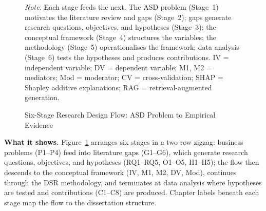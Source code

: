 \begin{figure}[!htbp]
{%
}
\caption[Research Design Flow]{Six-Stage Research Design Flow: ASD Problem to Empirical Evidence}
\label{fig:research_design_flow}
\vspace{0.5em}
\noindent\textit{Note.} Each stage feeds the next. The ASD problem (Stage~1) motivates the literature review and gaps (Stage~2); gaps generate research questions, objectives, and hypotheses (Stage~3); the conceptual framework (Stage~4) structures the variables; the methodology (Stage~5) operationalises the framework; data analysis (Stage~6) tests the hypotheses and produces contributions. IV = independent variable; DV = dependent variable; M1, M2 = mediators; Mod = moderator; CV = cross-validation; SHAP = Shapley additive explanations; RAG = retrieval-augmented generation.
\end{figure}

\iffalse %

\noindent\textbf{What it shows.} Figure~\ref{fig:research_design_flow} arranges six stages in a two-row zigzag: business problems (P1--P4) feed into literature gaps (G1--G6), which generate research questions, objectives, and hypotheses (RQ1--RQ5, O1--O5, H1--H5); the flow then descends to the conceptual framework (IV, M1, M2, DV, Mod), continues through the DSR methodology, and terminates at data analysis where hypotheses are tested and contributions (C1--C8) are produced. Chapter labels beneath each stage map the flow to the dissertation structure.


